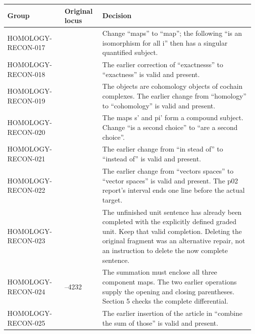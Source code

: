 {\def\LTcaptype{none} %
\begin{longtable}[]{@{}
  >{\raggedright\arraybackslash}p{}
  >{\raggedright\arraybackslash}p{}
  >{\raggedright\arraybackslash}p{}@{}}
\toprule\noalign{}
\begin{minipage}[b]{\linewidth}\raggedright
Group
\end{minipage} & \begin{minipage}[b]{\linewidth}\raggedright
Original locus
\end{minipage} & \begin{minipage}[b]{\linewidth}\raggedright
Decision
\end{minipage} \\
\midrule\noalign{}
\endhead
\bottomrule\noalign{}
\endlastfoot
HOMOLOGY-RECON-017 & 3165 & Change ``maps'' to ``map''; the following ``is an isomorphism for all i'' then has a singular quantified subject. \\
HOMOLOGY-RECON-018 & 3246 & The earlier correction of ``exactnesss'' to ``exactness'' is valid and present. \\
HOMOLOGY-RECON-019 & 3560 & The objects are cohomology objects of cochain complexes. The earlier change from ``homology'' to ``cohomology'' is valid and present. \\
HOMOLOGY-RECON-020 & 3577 & The maps s' and pi' form a compound subject. Change ``is a second choice'' to ``are a second choice''. \\
HOMOLOGY-RECON-021 & 3962 & The earlier change from ``in stead of'' to ``instead of'' is valid and present. \\
HOMOLOGY-RECON-022 & 4048 & The earlier change from ``vectors spaces'' to ``vector spaces'' is valid and present. The p02 report's interval ends one line before the actual target. \\
HOMOLOGY-RECON-023 & 4074 & The unfinished unit sentence has already been completed with the explicitly defined graded unit. Keep that valid completion. Deleting the original fragment was an alternative repair, not an instruction to delete the now complete sentence. \\
HOMOLOGY-RECON-024 & 4231--4232 & The summation must enclose all three component maps. The two earlier operations supply the opening and closing parentheses. Section 5 checks the complete differential. \\
HOMOLOGY-RECON-025 & 4242 & The earlier insertion of the article in ``combine the sum of those'' is valid and present. \\
\end{longtable}
}

